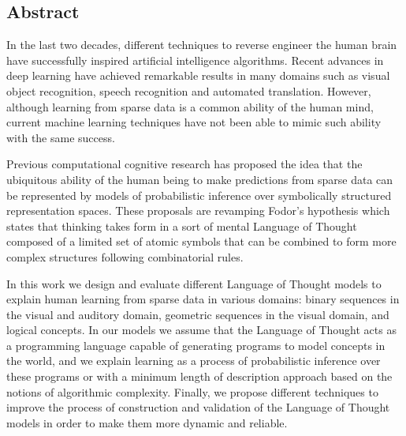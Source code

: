 \rhead{}
\lhead{}
\renewcommand{\headrulewidth}{0pt}
\begin{center}
    \section*{Abstract}
\end{center}

In the last two decades, different techniques to reverse engineer the human brain have successfully inspired artificial intelligence algorithms. Recent advances in deep learning have achieved remarkable results in many domains such as visual object recognition, speech recognition and automated translation. However, although learning from sparse data is a common ability of the human mind, current machine learning techniques have not been able to mimic such ability with the same success.\\
\medskip

Previous computational cognitive research has proposed the idea that the ubiquitous ability of the human being to make predictions from sparse data can be represented by models of probabilistic inference over symbolically structured representation spaces. These proposals are revamping Fodor's hypothesis which states that thinking takes form in a sort of mental Language of Thought composed of a limited set of atomic symbols that can be combined to form more complex structures following combinatorial rules.\\

\medskip

In this work we design and evaluate different Language of Thought models to explain human learning from sparse data in various domains: binary sequences in the visual and auditory domain, geometric sequences in the visual domain, and logical concepts. In our models we assume that the Language of Thought acts as a programming language capable of generating programs to model concepts in the world, and we explain learning as a process of probabilistic inference over these programs or with a minimum length of description approach based on the notions of algorithmic complexity. Finally, we propose different techniques to improve the process of construction and validation of the Language of Thought models in order to make them more dynamic and reliable.

\newpage

